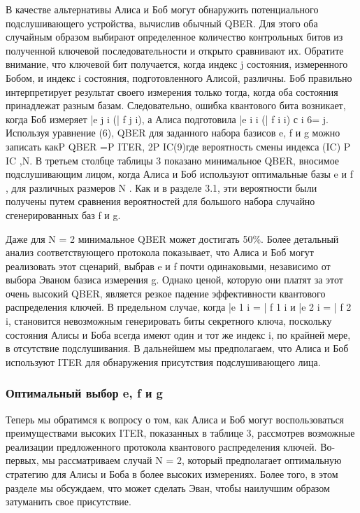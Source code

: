 В качестве альтернативы Алиса и Боб могут обнаружить потенциального подслушивающего устройства, вычислив обычный QBER. Для этого оба случайным образом выбирают определенное количество контрольных битов из полученной ключевой последовательности и открыто сравнивают их. Обратите внимание, что ключевой бит получается, когда индекс j состояния, измеренного Бобом, и индекс i состояния, подготовленного Алисой, различны. Боб правильно интерпретирует результат своего измерения только тогда, когда оба состояния принадлежат разным базам. Следовательно, ошибка квантового бита возникает, когда Боб измеряет |e j i (| f j i), а Алиса подготовила |e i i (| f i i) с i 6= j. Используя уравнение (6), QBER для заданного набора базисов e, f и g можно записать какP QBER =P ITER,
2P IC(9)где вероятность смены индекса (IC) P IC ,N. В третьем столбце таблицы 3 показано минимальное QBER, вносимое подслушивающим лицом, когда Алиса и Боб используют оптимальные базы e и f , для различных размеров N . Как и в разделе 3.1, эти вероятности были получены путем сравнения вероятностей для большого набора случайно сгенерированных баз f и g.

Даже для N = 2 минимальное QBER может достигать 50\%. Более детальный анализ соответствующего протокола показывает, что Алиса и Боб могут реализовать этот сценарий, выбрав e и f почти одинаковыми, независимо от выбора Эваном базиса измерения g. Однако ценой, которую они платят за этот очень высокий QBER, является резкое падение эффективности квантового распределения ключей. В предельном случае, когда |e 1 i = | f 1 i и |e 2 i = | f 2 i, становится невозможным генерировать биты секретного ключа, поскольку состояния Алисы и Боба всегда имеют один и тот же индекс i, по крайней мере, в отсутствие подслушивания. В дальнейшем мы предполагаем, что Алиса и Боб используют ITER для обнаружения присутствия подслушивающего лица.

\subsubsection{Оптимальный выбор e, f и g}

Теперь мы обратимся к вопросу о том, как Алиса и Боб могут воспользоваться преимуществами высоких ITER, показанных в таблице 3, рассмотрев возможные реализации предложенного протокола квантового распределения ключей. Во-первых, мы рассматриваем случай N = 2, который предполагает оптимальную стратегию для Алисы и Боба в более высоких измерениях. Более того, в этом разделе мы обсуждаем, что может сделать Эван, чтобы наилучшим образом затуманить свое присутствие.

